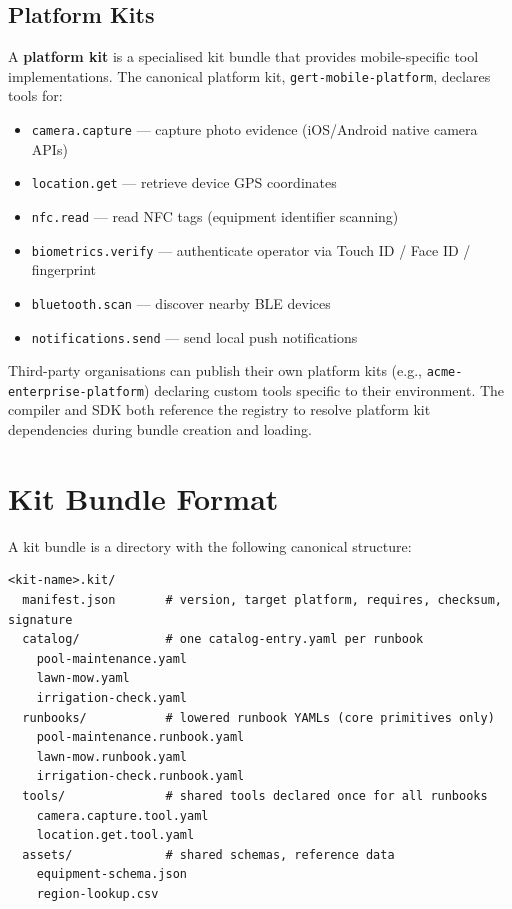 \subsection{Platform Kits}

A \textbf{platform kit} is a specialised kit bundle that provides mobile-specific tool implementations. The canonical platform kit, \texttt{gert-mobile-platform}, declares tools for:

\begin{itemize}
  \item \texttt{camera.capture} — capture photo evidence (iOS/Android native camera APIs)
  \item \texttt{location.get} — retrieve device GPS coordinates
  \item \texttt{nfc.read} — read NFC tags (equipment identifier scanning)
  \item \texttt{biometrics.verify} — authenticate operator via Touch ID / Face ID / fingerprint
  \item \texttt{bluetooth.scan} — discover nearby BLE devices
  \item \texttt{notifications.send} — send local push notifications
\end{itemize}

Third-party organisations can publish their own platform kits (e.g., \texttt{acme-enterprise-platform}) declaring custom tools specific to their environment. The compiler and SDK both reference the registry to resolve platform kit dependencies during bundle creation and loading.

\section{Kit Bundle Format}

A kit bundle is a directory with the following canonical structure:

\begin{verbatim}
<kit-name>.kit/
  manifest.json       # version, target platform, requires, checksum, signature
  catalog/            # one catalog-entry.yaml per runbook
    pool-maintenance.yaml
    lawn-mow.yaml
    irrigation-check.yaml
  runbooks/           # lowered runbook YAMLs (core primitives only)
    pool-maintenance.runbook.yaml
    lawn-mow.runbook.yaml
    irrigation-check.runbook.yaml
  tools/              # shared tools declared once for all runbooks
    camera.capture.tool.yaml
    location.get.tool.yaml
  assets/             # shared schemas, reference data
    equipment-schema.json
    region-lookup.csv
\end{verbatim}

